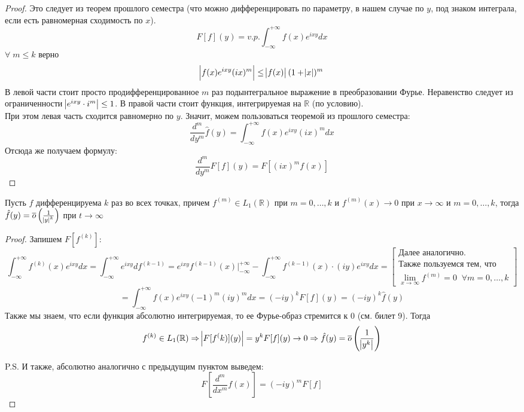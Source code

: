 \begin{proof}
    Это следует из теорем прошлого семестра (что можно дифференцировать по параметру, в нашем случае по $y$, под знаком интеграла, если есть равномерная сходимость по $x$).
    $$
    F[f](y) = v.p.\int_{-\infty}^{+\infty}f(x)e^{ixy}dx
    $$
    $\forall\; m \le k$ верно
    $$
    \abs{f(x)e^{ixy}(ix)^m} \le \abs{f(x)}(1 + \abs{x})^m
    $$
    В левой части стоит просто продифференцированное $m$ раз подынтегральное выражение в преобразовании Фурье. Неравенство следует из ограниченности $\abs{e^{ixy}\cdot i^m} \le 1$. В правой части стоит функция, интегрируемая на $\mathbb{R}$ (по условию).\\
    При этом левая часть сходится равномерно по $y$. Значит, можем пользоваться теоремой из прошлого семестра:
    $$
        \frac{d^m}{dy^m}\hat{f}(y) = \int_{-\infty}^{+\infty}f(x)e^{ixy}(ix)^mdx
    $$
    Отсюда же получаем формулу:
    $$
    \frac{d^m}{dy^m}F[f](y) = F[(ix)^m f(x)]
    $$
\end{proof}

\begin{statement}
    Пусть $f$ дифференцируема $k$ раз во всех точках, причем $f^{(m)}\in L_1(\mathbb{R})$ при $m = 0, \ldots, k$ и $f^{(m)}(x)\to 0$ при $x\to\infty$ и $m = 0, \ldots, k$, тогда $\hat{f}(y) = \overline{o}\left(\frac{1}{\abs{y}^k}\right)$ при $t\to\infty$
\end{statement}

\begin{proof}
    Запишем $F[f^(k)]$:
    $$
    \int_{-\infty}^{+\infty}f^{(k)}(x)e^{ixy}dx = \int_{-\infty}^{+\infty}e^{ixy}df^(k - 1) = e^{ixy}f^{(k - 1)}(x)\Big|_{-\infty}^{+\infty} - \int_{-\infty}^{+\infty}f^{(k - 1)}(x)\cdot (iy)e^{ixy}dx =
    \begin{bmatrix}
    \textrm{Далее аналогично.} \\
    \textrm{Также пользуемся тем, что }\\
    \lim\limits_{x\to\infty}f^{(m)} = 0\;\;\forall m = 0, \ldots, k
    \end{bmatrix}
    $$
    $$
    =
    \int_{-\infty}^{+\infty}f(x)e^{ixy}(-1)^m (iy)^m dx
    =
    (-iy)^k F[f](y) = (-iy)^k \hat{f}(y)
    $$
    Также мы знаем, что если функция абсолютно интегрируемая, то ее Фурье-образ стремится к 0 (см. билет 9). Тогда
    $$f^{(k)}\in L_1(\mathbb{R}) \Rightarrow \abs{F[f^(k)](y)} = y^k F[f](y) \to 0 \Rightarrow \hat{f}(y) = \overline{o}\left(\frac{1}{\abs{y^k}}\right)$$
    
    P.S. И также, абсолютно аналогично с предыдущим пунктом выведем:
    $$
        F\left[\frac{d^m}{dx^m}f(x)\right] = (-iy)^m F[f]
    $$
\end{proof}

